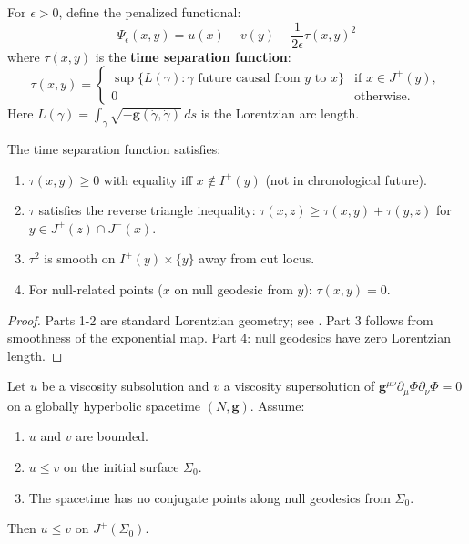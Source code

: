 \begin{definition}
For $\epsilon > 0$, define the penalized functional:
\begin{equation}
    \Psi_\epsilon(x, y) = u(x) - v(y) - \frac{1}{2\epsilon}\tau(x, y)^2
\end{equation}
where $\tau(x, y)$ is the \textbf{time separation function}:
\begin{equation}
    \tau(x, y) = \begin{cases}
        \sup\{L(\gamma) : \gamma \text{ future causal from } y \text{ to } x\} & \text{if } x \in J^+(y), \\
        0 & \text{otherwise}.
    \end{cases}
\end{equation}
Here $L(\gamma) = \int_\gamma \sqrt{-\mathbf{g}(\dot{\gamma}, \dot{\gamma})} \, ds$ is the Lorentzian arc length.
\end{definition}

\begin{lemma}\label{lem:tauprops}
The time separation function satisfies:
\begin{enumerate}
    \item $\tau(x, y) \geq 0$ with equality iff $x \notin I^+(y)$ (not in chronological future).
    \item $\tau$ satisfies the reverse triangle inequality: $\tau(x, z) \geq \tau(x, y) + \tau(y, z)$ for $y \in J^+(z) \cap J^-(x)$.
    \item $\tau^2$ is smooth on $I^+(y) \times \{y\}$ away from cut locus.
    \item For null-related points ($x$ on null geodesic from $y$): $\tau(x, y) = 0$.
\end{enumerate}
\end{lemma}

\begin{proof}
Parts 1-2 are standard Lorentzian geometry; see \cite{BEE96}. Part 3 follows from smoothness of the exponential map. Part 4: null geodesics have zero Lorentzian length.
\end{proof}

\begin{theorem}\label{thm:partialcomp}
Let $u$ be a viscosity subsolution and $v$ a viscosity supersolution of $\mathbf{g}^{\mu\nu}\partial_\mu\Phi\partial_\nu\Phi = 0$ on a globally hyperbolic spacetime $(N, \mathbf{g})$. Assume:
\begin{enumerate}
    \item[(H1)] $u$ and $v$ are bounded.
    \item[(H2)] $u \leq v$ on the initial surface $\Sigma_0$.
    \item[(H3)] The spacetime has no conjugate points along null geodesics from $\Sigma_0$.
\end{enumerate}
Then $u \leq v$ on $J^+(\Sigma_0)$.
\end{theorem}

